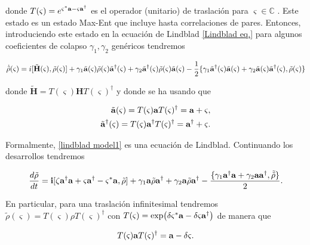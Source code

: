 \documentclass{report} %
\numberwithin{equation}{section}
\begin{document}
donde $T(\varsigma) = e^{\varsigma^{*}{\bf a}-\varsigma {\bf a}^{\dagger}}$ es el operador (unitario) de traslación para $\varsigma \in \mathds{C}$ \cite{CohenTannoudji1989}. Este estado es un estado Max-Ent que incluye hasta correlaciones de pares. 
Entonces, introduciendo este estado en la ecuación de Lindblad \eqref{Lindblad eq.} para algunos coeficientes de colapso $\gamma_1, \gamma_2$ genéricos tendremos 

\begin{equation}
    \dot{\tilde{\rho}}(\varsigma) = i [\tilde{\mathbf{H}}(\varsigma), \tilde{\rho}(\varsigma)] + \gamma_1 \tilde{{\bf a}}(\varsigma) \tilde{\rho}(\varsigma) \tilde{{\bf a}}^{\dagger}(\varsigma) + \gamma_2 \tilde{{\bf a}}^{\dagger}(\varsigma)\tilde{\rho}(\varsigma) \tilde{{\bf a}}(\varsigma) - \frac{1}{2} \{{\gamma_1\tilde{{\bf a}}^{\dagger}}(\varsigma)\tilde{{\bf a}}(\varsigma) + \gamma_2 \tilde{{\bf a}}(\varsigma)\tilde{{\bf a}}^{\dagger}(\varsigma) ,\tilde{\rho}(\varsigma)\} 
    \label{lindblad model1}
\end{equation}

donde $\tilde{\mathbf{H}} = T(\varsigma) \mathbf{H} T(\varsigma)^{\dagger} $ y donde se ha usando que 

\begin{align}
\tilde{{\bf a}}(\varsigma) = T(\varsigma) {\bf a} T(\varsigma)^{\dagger} = {\bf a} + \varsigma,
\\
\tilde{{\bf a}}^{\dagger}(\varsigma) = T(\varsigma) {\bf a}^{\dagger} T(\varsigma)^{\dagger} = {\bf a}^{\dagger} + \varsigma.
\label{model 1 trl2}
\end{align}

Formalmente, \eqref{lindblad model1} es una ecuación de Lindblad. Continuando los desarrollos tendremos

\begin{equation}
\frac{d\tilde{\rho}}{dt}={\bf i }[\zeta {\bf a}^\dagger {\bf a} +\varsigma {\bf a}^\dagger -\varsigma^* {\bf a} ,\tilde{\rho}]+
\gamma_1 {\bf a}\tilde{\rho} {\bf a}^\dagger +
\gamma_2 {\bf a}\tilde{\rho} {\bf a}^\dagger-\frac{\{\gamma_1 {\bf a}^\dagger{\bf a}+\gamma_2 {\bf a}{\bf a}^\dagger,\tilde{\tilde{\rho}}\}}{2}.
\end{equation}

En particular, para una traslación infinitesimal tendremos $\tilde{\rho}(\varsigma) = T(\varsigma) \rho T(\varsigma)^{\dagger}$ con $T(\varsigma)= \exp(\delta\varsigma^{*} {\bf a} - \delta\varsigma {\bf a}^{\dagger})$ de manera que 

\begin{equation}
    T(\varsigma) {\bf a} T(\varsigma)^{\dagger} = {\bf a} - \delta\varsigma.
\end{equation}
\end{document}
